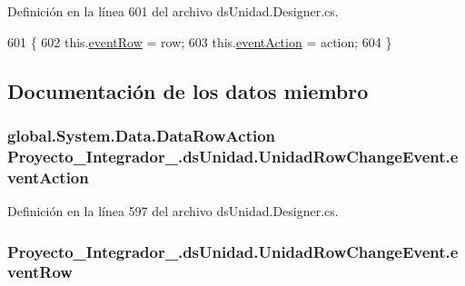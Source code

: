 Definición en la línea 601 del archivo ds\-Unidad.\-Designer.\-cs.


\begin{DoxyCode}
601                                                                                                \{
602                 this.\hyperlink{class_proyecto___integrador__3_1_1ds_unidad_1_1_unidad_row_change_event_a936ab56f7290f91322dfe7219b900879}{eventRow} = row;
603                 this.\hyperlink{class_proyecto___integrador__3_1_1ds_unidad_1_1_unidad_row_change_event_aa562cf13c8016aa4c66b68eb924d9a2d}{eventAction} = action;
604             \}
\end{DoxyCode}


\subsection{Documentación de los datos miembro}
\hypertarget{class_proyecto___integrador__3_1_1ds_unidad_1_1_unidad_row_change_event_aa562cf13c8016aa4c66b68eb924d9a2d}{
\subsubsection[{event\-Action}]{\setlength{\rightskip}{0pt plus 5cm}global.\-System.\-Data.\-Data\-Row\-Action Proyecto\-\_\-\-Integrador\-\_.\-ds\-Unidad.\-Unidad\-Row\-Change\-Event.\-event\-Action\hspace{0.3cm}{\ttfamily [private]}}}\label{class_proyecto___integrador__3_1_1ds_unidad_1_1_unidad_row_change_event_aa562cf13c8016aa4c66b68eb924d9a2d}


Definición en la línea 597 del archivo ds\-Unidad.\-Designer.\-cs.

\hypertarget{class_proyecto___integrador__3_1_1ds_unidad_1_1_unidad_row_change_event_a936ab56f7290f91322dfe7219b900879}{
\subsubsection[{event\-Row}]{ Proyecto\-\_\-\-Integrador\-\_.\-ds\-Unidad.\-Unidad\-Row\-Change\-Event.\-event\-Row\hspace{0.3cm}{\ttfamily [private]}}}\label{class_proyecto___integrador__3_1_1ds_unidad_1_1_unidad_row_change_event_a936ab56f7290f91322dfe7219b900879}


